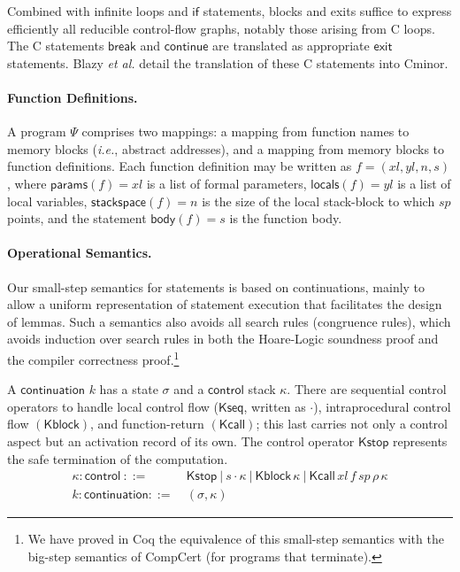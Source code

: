 \documentclass{llncs}
\newcommand{\cminor}{Cminor}
\newcommand{\compcert}{CompCert}
\newcommand{\tyface}[1]{\ensuremath{\mathsf{#1}}}
\newcommand{\Kstop}{\tyface{Kstop}}
\newcommand{\Kseq}[2]{#1\cdot #2}
\newcommand{\Kblock}[1]{\tyface{Kblock\,#1}}
\newcommand{\Kcall}[5]{\tyface{Kcall}\,#1\,#2\,#3\,#4\,#5}
\newcommand{\Cont}[2]{(#1,#2)}
\newcommand{\st}{\sigma}
\newcommand{\ctl}{\kappa} \newcommand{\stmt}{\tyface{stmt}}
\newcommand{\continuation}{\tyface{continuation}}
\newcommand{\fmap}{\Psi}
\begin{document}
Combined with infinite loops and $\tyface{if}$ statements, blocks and exits
suffice to express efficiently all reducible control-flow graphs, notably those arising from
C loops.
The C statements $\tyface{break}$ and $\tyface{continue}$ are translated as
appropriate $\tyface{exit}$ statements. Blazy \emph{et al.} \cite{blazy06:fm} detail the translation of these C statements
into \cminor.

\paragraph{Function Definitions.}
A program $\fmap$ comprises two mappings:
a mapping from function names to memory blocks (\textit{i.e.}, abstract
addresses),
and a mapping from memory blocks to function definitions.
Each function definition may be written as
$f=( \mathit{xl},\mathit{yl},n,s)$, where 
$\tyface{params}(f)=\mathit{xl}$ is a list of formal parameters,
$\tyface{locals}(f)=\mathit{yl}$ is a list of local variables,
$\tyface{stackspace}(f)=n$ is the size of the local stack-block to which
$\mathit{sp}$ points, and the statement $\tyface{body}(f)=s$ is the 
function body.  

\paragraph{Operational Semantics.}
Our small-step semantics for statements is based on continuations, 
mainly to allow a uniform representation of statement execution
that facilitates the design of lemmas.
Such a semantics also avoids all search rules (congruence rules),
which avoids induction over search rules in both
the Hoare-Logic soundness proof and the compiler correctness proof.\footnote{
We have proved in Coq the
equivalence of this small-step semantics with the 
big-step semantics of \compcert{} 
(for programs that terminate).} 

\begin{definition}
A \tyface{continuation} $k$ has
a state $\st$
and a \tyface{control} stack $\ctl$. There are 
sequential control operators
to handle local control flow ($\tyface{Kseq}$, written as
 $\cdot$), 
intraprocedural control flow $(\tyface{Kblock})$,
and function-return $(\tyface{Kcall})$; this last carries not only
a control aspect but an activation record of its own.
The control operator $\Kstop$ represents the safe
termination of the computation.
\vspace{-8pt}
\begin{align*}
\ctl:\tyface{control}~::= &~ \Kstop ~|~  
\Kseq s \ctl
~|~ \Kblock\ctl 
~|~ \Kcall{\mathit{xl}}{f}{\mathit{sp}}{\rho}\ctl \\
k:\continuation ::= &~\Cont{\st}{\ctl}
\end{align*}
\end{definition}
\end{document}
